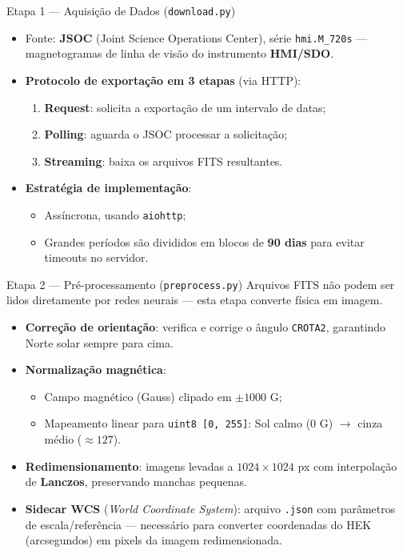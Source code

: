 \documentclass[aspectratio=169]{beamer}
\begin{document}
\begin{frame}{Etapa 1 — Aquisição de Dados (\texttt{download.py})}
  \begin{itemize}
    \item Fonte: \textbf{JSOC} (Joint Science Operations Center), série \texttt{hmi.M\_720s} — magnetogramas de linha de visão do instrumento \textbf{HMI/SDO}.
    \item \textbf{Protocolo de exportação em 3 etapas} (via HTTP):
    \begin{enumerate}
      \item \textbf{Request}: solicita a exportação de um intervalo de datas;
      \item \textbf{Polling}: aguarda o JSOC processar a solicitação;
      \item \textbf{Streaming}: baixa os arquivos FITS resultantes.
    \end{enumerate}
    \item \textbf{Estratégia de implementação}:
    \begin{itemize}
      \item Assíncrona, usando \texttt{aiohttp};
      \item Grandes períodos são divididos em blocos de \textbf{90 dias} para evitar timeouts no servidor.
    \end{itemize}
  \end{itemize}
\end{frame}

\begin{frame}{Etapa 2 — Pré-processamento (\texttt{preprocess.py})}
  Arquivos FITS não podem ser lidos diretamente por redes neurais — esta etapa converte física em imagem.
  \begin{itemize}
    \item \textbf{Correção de orientação}: verifica e corrige o ângulo \texttt{CROTA2}, garantindo Norte solar sempre para cima.
    \item \textbf{Normalização magnética}:
    \begin{itemize}
      \item Campo magnético (Gauss) clipado em $\pm 1000$ G;
      \item Mapeamento linear para \texttt{uint8 [0, 255]}: Sol calmo (0 G) $\rightarrow$ cinza médio ($\approx 127$).
    \end{itemize}
    \item \textbf{Redimensionamento}: imagens levadas a $1024 \times 1024$ px com interpolação de \textbf{Lanczos}, preservando manchas pequenas.
    \item \textbf{Sidecar WCS} (\emph{World Coordinate System}): arquivo \texttt{.json} com parâmetros de escala/referência — necessário para converter coordenadas do HEK (arcsegundos) em pixels da imagem redimensionada.
  \end{itemize}
\end{frame}
\end{document}

